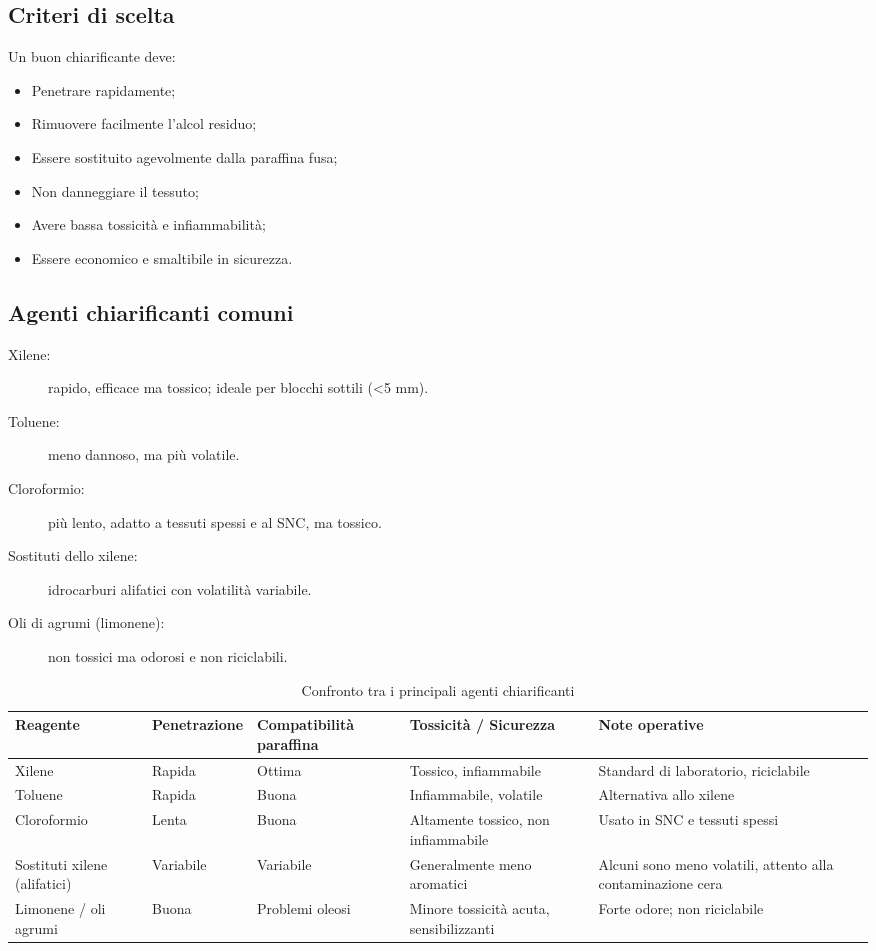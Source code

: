 \subsection{Criteri di scelta}
Un buon chiarificante deve:
\begin{itemize}
    \item Penetrare rapidamente;
    \item Rimuovere facilmente l’alcol residuo;
    \item Essere sostituito agevolmente dalla paraffina fusa;
    \item Non danneggiare il tessuto;
    \item Avere bassa tossicità e infiammabilità;
    \item Essere economico e smaltibile in sicurezza.
\end{itemize}

\subsection{Agenti chiarificanti comuni}
\begin{description}
    \item[Xilene:] rapido, efficace ma tossico; ideale per blocchi sottili (<5 mm).  
    \item[Toluene:] meno dannoso, ma più volatile.  
    \item[Cloroformio:] più lento, adatto a tessuti spessi e al SNC, ma tossico.  
    \item[Sostituti dello xilene:] idrocarburi alifatici con volatilità variabile.  
    \item[Oli di agrumi (limonene):] non tossici ma odorosi e non riciclabili.
\end{description}
\begin{table}[htbp]
  \centering
  \caption{Confronto tra i principali agenti chiarificanti}
  \label{tab:chiarificanti}
  \begin{adjustbox}{max width=\textwidth}
  \begin{tabular}{@{}lllll@{}}
    \toprule
    \textbf{Reagente} & \textbf{Penetrazione} & \textbf{Compatibilità paraffina} & \textbf{Tossicità / Sicurezza} & \textbf{Note operative} \\
    \midrule
    Xilene & Rapida & Ottima & Tossico, infiammabile & Standard di laboratorio, riciclabile \\
    Toluene & Rapida & Buona & Infiammabile, volatile & Alternativa allo xilene \\
    Cloroformio & Lenta & Buona & Altamente tossico, non infiammabile & Usato in SNC e tessuti spessi \\
    Sostituti xilene (alifatici) & Variabile & Variabile & Generalmente meno aromatici & Alcuni sono meno volatili, attento alla contaminazione cera \\
    Limonene / oli agrumi & Buona & Problemi oleosi & Minore tossicità acuta, sensibilizzanti & Forte odore; non riciclabile \\
    \bottomrule
  \end{tabular}
  \end{adjustbox}
\end{table}




